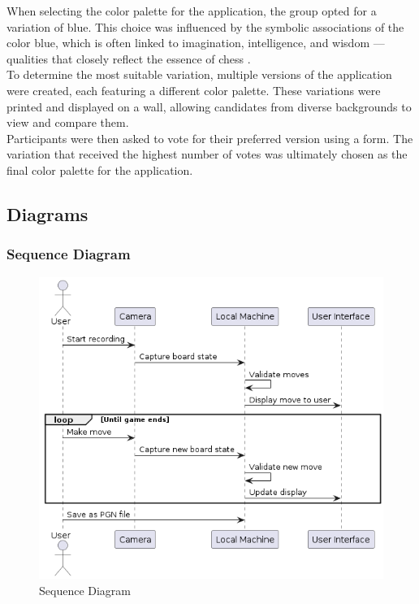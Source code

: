 When selecting the color palette for the application, the group opted for a variation of blue. This choice was influenced by the symbolic associations of the color blue, which is often linked to imagination, intelligence, and wisdom \cite{blue}—qualities that closely reflect the essence of chess \cite{chess:ppqty, chess:chess-and-creativity}. \\

To determine the most suitable variation, multiple versions of the application were created, each featuring a different color palette. These variations were printed and displayed on a wall, allowing candidates from diverse backgrounds to view and compare them. \\

Participants were then asked to vote for their preferred version using a form. The variation that received the highest number of votes was ultimately chosen as the final color palette for the application. \\


\subsection{Diagrams}
\label{subsec:diagrams}

\subsubsection*{Sequence Diagram}
\label{subsubsec:sequence-diagram}

\begin{figure}[h!]
    \centering
    \includegraphics[width=0.75\linewidth]{figures/uml/sequence.png}
    \caption[Sequence Diagram]{Sequence Diagram}
    \label{fig:sequence}
\end{figure}

